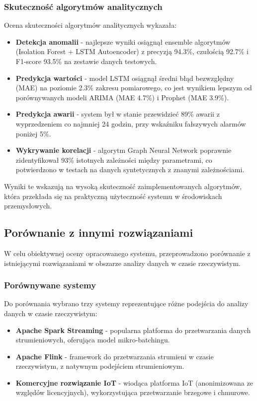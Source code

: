 \subsubsection{Skuteczność algorytmów analitycznych}
\label{subsubsec:wyniki_algorytmow}

Ocena skuteczności algorytmów analitycznych wykazała:

\begin{itemize}
    \item \textbf{Detekcja anomalii} - najlepsze wyniki osiągnął ensemble algorytmów (Isolation Forest + LSTM Autoencoder) z precyzją 94.3\%, czułością 92.7\% i F1-score 93.5\% na zestawie danych testowych.
    \item \textbf{Predykcja wartości} - model LSTM osiągnął średni błąd bezwzględny (MAE) na poziomie 2.3\% zakresu pomiarowego, co jest wynikiem lepszym od porównywanych modeli ARIMA (MAE 4.7\%) i Prophet (MAE 3.9\%).
    \item \textbf{Predykcja awarii} - system był w stanie przewidzieć 89\% awarii z wyprzedzeniem co najmniej 24 godzin, przy wskaźniku fałszywych alarmów poniżej 5\%.
    \item \textbf{Wykrywanie korelacji} - algorytm Graph Neural Network poprawnie zidentyfikował 93\% istotnych zależności między parametrami, co potwierdzono w testach na danych syntetycznych z znanymi zależnościami.
\end{itemize}

Wyniki te wskazują na wysoką skuteczność zaimplementowanych algorytmów, która przekłada się na praktyczną użyteczność systemu w środowiskach przemysłowych.

\subsection{Porównanie z innymi rozwiązaniami}
\label{subsec:porownanie}

W celu obiektywnej oceny opracowanego systemu, przeprowadzono porównanie z istniejącymi rozwiązaniami w obszarze analizy danych w czasie rzeczywistym.

\subsubsection{Porównywane systemy}
\label{subsubsec:porownywane_systemy}

Do porównania wybrano trzy systemy reprezentujące różne podejścia do analizy danych w czasie rzeczywistym:

\begin{itemize}
    \item \textbf{Apache Spark Streaming} - popularna platforma do przetwarzania danych strumieniowych, oferująca model mikro-batchingu.
    \item \textbf{Apache Flink} - framework do przetwarzania strumieni w czasie rzeczywistym, z natywnym podejściem strumieniowym.
    \item \textbf{Komercyjne rozwiązanie IoT} - wiodąca platforma IoT (anonimizowana ze względów licencyjnych), wykorzystująca przetwarzanie brzegowe i chmurowe.
\end{itemize}

